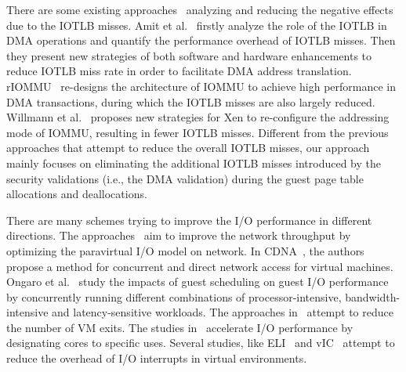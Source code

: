 There are some existing approaches~\cite{amit2012iommu, malka2015riommu, willmann2008protection} analyzing and reducing the negative effects due to the IOTLB misses.
Amit et al.~\cite{amit2012iommu} firstly analyze the role of the IOTLB in DMA operations and quantify the performance overhead of IOTLB misses. Then they present new strategies of both software and hardware enhancements to reduce IOTLB miss rate in order to facilitate DMA address translation. rIOMMU~\cite{malka2015riommu} re-designs the architecture of IOMMU to achieve high performance in DMA transactions, during which the IOTLB misses are also largely reduced. Willmann et al.~\cite{willmann2008protection} proposes new strategies for Xen to re-configure the addressing mode of IOMMU, resulting in fewer IOTLB misses.
Different from the previous approaches that attempt to reduce the overall IOTLB misses, our approach mainly focuses on eliminating the additional IOTLB misses introduced by the security validations (i.e., the DMA validation) during the guest page table allocations and deallocations.

There are many schemes trying to improve the I/O performance in different directions.
The approaches~\cite{menon2006optimizing,4734994,santos2008bridging} aim to improve the network throughput by optimizing the paravirtual I/O model on network.
In CDNA~\cite{cdna}, the authors propose a method for concurrent and direct network access for virtual machines.
Ongaro et al.~\cite{ongaro2008scheduling} study the impacts of guest scheduling on guest I/O performance by concurrently running different combinations of processor-intensive, bandwidth-intensive and latency-sensitive workloads. The approaches in~\cite{gordon2012towards,har2013efficient} attempt to reduce the number of VM exits. The studies in~\cite{liao2008software,liu2009virtualization,shalev2010isostack,landau2011splitx,xu2013vturbo} accelerate I/O performance by  designating cores to specific uses.
Several studies, like ELI~\cite{eli} and vIC~\cite{vic} attempt to reduce the overhead of I/O interrupts in virtual environments.




